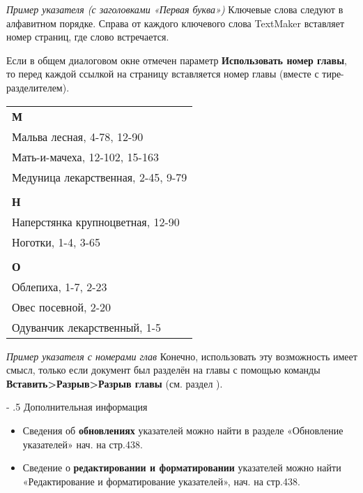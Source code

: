 ﻿\documentclass[a4paper,10pt]{article}
\makeatletter
\renewcommand\paragraph{%
   \@startsection{paragraph}{4}{0mm}%
      {-\baselineskip}%
      {.5\baselineskip}%
      {\normalfont\normalsize\bfseries}}
\makeatother
\begin{document}
{\footnotesize \textit{Пример указателя (с заголовками «Первая буква»)}}
\newline
\newline
Ключевые слова следуют в алфавитном порядке. Справа от каждого ключевого слова TextMaker вставляет номер страниц, где слово встречается.

Если в общем диалоговом окне отмечен параметр \textbf{Использовать номер главы}, то перед каждой ссылкой на страницу вставляется номер главы (вместе с тире-разделителем).

\begin{center}
\begin{tabular}{ | m{16cm} | }  
\hline
 \textbf{М} \\ 
  Мальва лесная, 4-78, 12-90 \\
  Мать-и-мачеха, 12-102, 15-163\\ 
Медуница лекарственная, 2-45, 9-79 \\
 \\
\textbf{Н} \\
Наперстянка крупноцветная, 12-90\\
Ноготки, 1-4, 3-65\\
\\
\textbf{О}\\
Облепиха, 1-7, 2-23\\
Овес посевной, 2-20\\
Одуванчик лекарственный, 1-5\\
\hline
\end{tabular} 
\end{center}

{\footnotesize \textit{Пример указателя с номерами глав}}
\newline
\newline
Конечно, использовать эту возможность имеет смысл, только если документ был разделён на главы с помощью команды \textbf{Вставить>Разрыв>Разрыв главы} (см. раздел ).

\paragraph{Дополнительная информация}
\begin{itemize}
 \item Сведения об \textbf{обновлениях} указателей можно найти в разделе «Обновление указателей» нач. на стр.438.
 \item Сведение о \textbf{редактировании и форматировании} указателей можно найти «Редактирование и форматирование указателей», нач. на стр.438.
\end{itemize}
\end{document}
